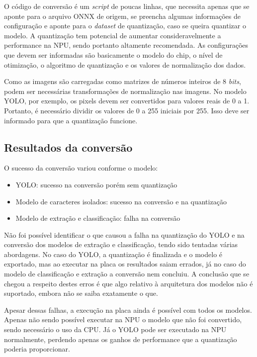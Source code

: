 O código de conversão é um \textit{script} de poucas linhas, que necessita apenas que se aponte para o arquivo ONNX de origem, se preencha algumas informações de configuração e aponte para o \textit{dataset} de quantização, caso se queira quantizar o modelo. A quantização tem potencial de aumentar consideravelmente a performance na NPU, sendo portanto altamente recomendada. As configurações que devem ser informadas são basicamente o modelo do chip, o nível de otimização, o algoritmo de quantização e os valores de normalização dos dados.

Como as imagens são carregadas como matrizes de números inteiros de 8 \textit{bits}, podem ser necessárias transformações de normalização nas imagens. No modelo YOLO, por exemplo, os pixels devem ser convertidos para valores reais de 0 a 1. Portanto, é necessário dividir os valores de 0 a 255 iniciais por 255. Isso deve ser informado para que a quantização funcione.

\subsection{Resultados da conversão}
O sucesso da conversão variou conforme o modelo:
\begin{itemize} 
\item YOLO: sucesso na conversão porém sem quantização 
\item Modelo de caracteres isolados: sucesso na conversão e na quantização 
\item Modelo de extração e classificação: falha na conversão 
\end{itemize}

Não foi possível identificar o que causou a falha na quantização do YOLO e na conversão dos modelos de extração e classificação, tendo sido tentadas várias abordagens. No caso do YOLO, a quantização é finalizada e o modelo é exportado, mas ao executar na placa os resultados saiam errados, já no caso do modelo de classificação e extração a conversão nem concluiu.
A conclusão que se chegou a respeito destes erros é que algo relativo à arquitetura dos modelos não é suportado, embora não se saiba exatamente o que.

Apesar dessas falhas, a execução na placa ainda é possível com todos os modelos. Apenas não sendo possível executar na NPU o modelo que não foi convertido, sendo necessário o uso da CPU. Já o YOLO pode ser executado na NPU normalmente, perdendo apenas os ganhos de performance que a quantização poderia proporcionar.

